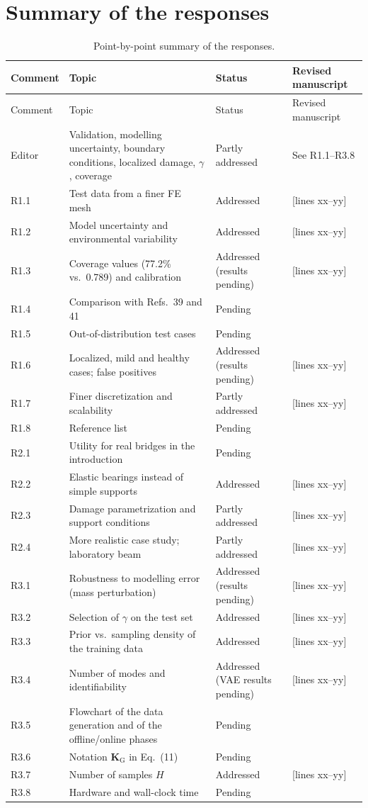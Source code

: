 \documentclass[11pt]{article}
\newcommand{\tbd}[1]{\textcolor{note}{\textsf{[#1]}}}
\newcommand{\lines}[1]{\tbd{lines #1}}
\begin{document}
\section{Summary of the responses}
{\small
\begin{longtable}{p{1.55cm}p{6.0cm}p{3.0cm}p{3.6cm}}
\caption{Point-by-point summary of the responses.}\label{tab:summary}\\
\toprule
Comment & Topic & Status & Revised manuscript \\
\midrule
\endfirsthead
\toprule
Comment & Topic & Status & Revised manuscript \\
\midrule
\endhead
Editor & Validation, modelling uncertainty, boundary conditions, localized damage, $\gamma$, coverage & Partly addressed & See R1.1--R3.8 \\
R1.1 & Test data from a finer FE mesh & Addressed & \lines{xx--yy} \\
R1.2 & Model uncertainty and environmental variability & Addressed & \lines{xx--yy} \\
R1.3 & Coverage values (77.2\% vs.\ 0.789) and calibration & Addressed (results pending) & \lines{xx--yy} \\
R1.4 & Comparison with Refs.\ 39 and 41 & Pending & \\
R1.5 & Out-of-distribution test cases & Pending & \\
R1.6 & Localized, mild and healthy cases; false positives & Addressed (results pending) & \lines{xx--yy} \\
R1.7 & Finer discretization and scalability & Partly addressed & \lines{xx--yy} \\
R1.8 & Reference list & Pending & \\
R2.1 & Utility for real bridges in the introduction & Pending & \\
R2.2 & Elastic bearings instead of simple supports & Addressed & \lines{xx--yy} \\
R2.3 & Damage parametrization and support conditions & Partly addressed & \lines{xx--yy} \\
R2.4 & More realistic case study; laboratory beam & Partly addressed & \lines{xx--yy} \\
R3.1 & Robustness to modelling error (mass perturbation) & Addressed (results pending) & \lines{xx--yy} \\
R3.2 & Selection of $\gamma$ on the test set & Addressed & \lines{xx--yy} \\
R3.3 & Prior vs.\ sampling density of the training data & Addressed & \lines{xx--yy} \\
R3.4 & Number of modes and identifiability & Addressed (VAE results pending) & \lines{xx--yy} \\
R3.5 & Flowchart of the data generation and of the offline/online phases & Pending & \\
R3.6 & Notation $\mathbf{K}_{\mathrm{G}}$ in Eq.~(11) & Pending & \\
R3.7 & Number of samples $H$ & Addressed & \lines{xx--yy} \\
R3.8 & Hardware and wall-clock time & Pending & \\
\bottomrule
\end{longtable}
}
\end{document}
